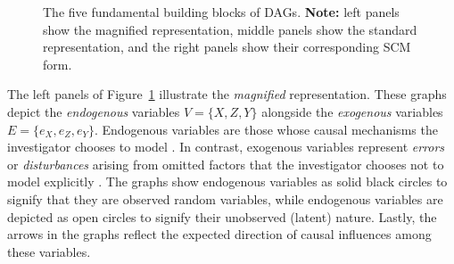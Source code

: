 \documentclass[
  authoryear,
  preprint,
  1p]{elsarticle}
\begin{document}
\begin{figure}
\begin{minipage}{0.33\linewidth}


\end{minipage}%
%
\begin{minipage}{0.33\linewidth}

\centering{

\[
\begin{aligned}
  X & := f_{X}(e_{X}) \\
  Z & := f_{Z}(X,Y,e_{Z}) \\
  Y & := f_{Y}(e_{Y}) \\
  e_{X} & \perp\!\!\!\perp e_{Y} \\
  e_{X} & \perp\!\!\!\perp e_{Z} \\
  e_{Z} & \perp\!\!\!\perp e_{Y}
\end{aligned}
\]

}


\end{minipage}%

\caption{\label{fig-dags_scms}The five fundamental building blocks of
DAGs. \textbf{Note:} left panels show the magnified representation,
middle panels show the standard representation, and the right panels
show their corresponding SCM form.}

\end{figure}%

The left panels of Figure~\ref{fig-dags_scms} illustrate the
\emph{magnified} representation. These graphs depict the
\emph{endogenous} variables \(V=\{X,Z,Y\}\) alongside the
\emph{exogenous} variables \(E=\{e_{X},e_{Z},e_{Y}\}\). Endogenous
variables are those whose causal mechanisms the investigator chooses to
model \citep{Neal_2020}. In contrast, exogenous variables represent
\emph{errors} or \emph{disturbances} arising from omitted factors that
the investigator chooses not to model explicitly
\citep[27,68]{Pearl_2009}. The graphs show endogenous variables as solid
black circles to signify that they are observed random variables, while
endogenous variables are depicted as open circles to signify their
unobserved (latent) nature. Lastly, the arrows in the graphs reflect the
expected direction of causal influences among these variables.
\end{document}
